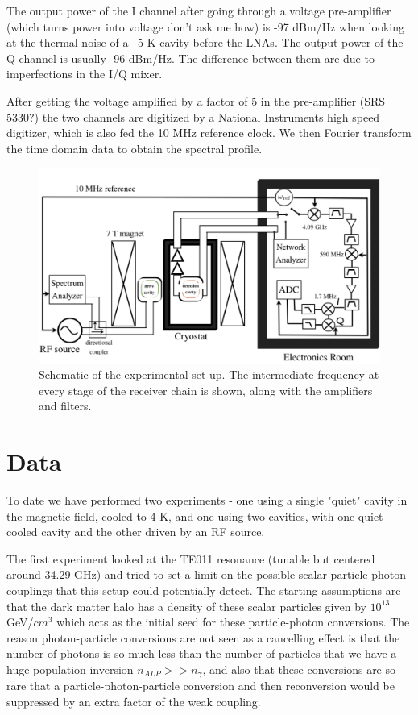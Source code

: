 \documentclass[11pt]{article}
\begin{document}
The output power of the I channel after going through a voltage pre-amplifier (which turns power into voltage don't ask me how) is -97 dBm/Hz when looking at the thermal noise of a ~5 K cavity before the LNAs. The output power of the Q channel is usually -96 dBm/Hz. The difference between them are due to imperfections in the I/Q mixer.

After getting the voltage amplified by a factor of 5 in the pre-amplifier (SRS 5330?) the two channels are digitized by a National Instruments high speed digitizer, which is also fed the 10 MHz reference clock. We then Fourier transform the time domain data to obtain the spectral profile.

\begin{figure}
\centering
\includegraphics[scale=0.35]{malagon_ana_fig1}
\caption{Schematic of the experimental set-up. The intermediate frequency at every stage of the receiver chain is shown, along with the amplifiers and filters.}
\label{fig:schematic}
\end{figure}

\section{Data}

To date we have performed two experiments - one using a single "quiet" cavity in the magnetic field, cooled to 4 K, and one using two cavities, with one quiet cooled cavity and the other driven by an RF source.

The first experiment looked at the TE011 resonance (tunable but centered around 34.29 GHz) and tried to set a limit on the possible scalar particle-photon couplings that this setup could potentially detect. The starting assumptions are that the dark matter halo has a density of these scalar particles given by  $10^{13}$ GeV/${cm}^3$ which acts as the initial seed for these particle-photon conversions. The reason photon-particle conversions are not seen as a cancelling effect is that the number of photons is so much less than the number of particles that we have a huge population inversion $n_{ALP} >> n_{\gamma}$, and also that these conversions are so rare that a particle-photon-particle conversion and then reconversion would be suppressed by an extra factor of the weak coupling.
\end{document}
